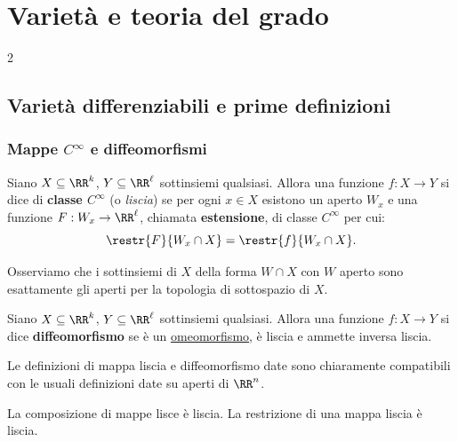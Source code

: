 \chapter{Varietà e teoria del grado}
\setlength{\parindent}{2pt}

\begin{multicols*}{2}
    \section{Varietà differenziabili e prime definizioni}

    \subsection{Mappe \texorpdfstring{$C^\infty$}{C∞} e diffeomorfismi}

    \begin{definition} Siano $X \subseteq \RR^k$,
        $Y \subseteq \RR^\ell$ sottinsiemi qualsiasi. Allora una funzione
        $f : X \to Y$ si dice di \textbf{classe $C^\infty$} (o \textit{liscia}) se per ogni
        $x \in X$ esistono un aperto $W_x$ e una funzione $F : W_x \to \RR^\ell$,
        chiamata \textbf{estensione}, di classe $C^\infty$ per cui:
        \[
            \restr{F}{W_x \cap X} = \restr{f}{W_x \cap X}.
        \]
    \end{definition}

    \begin{remark}
        Osserviamo che i sottinsiemi di $X$ della forma $W \cap X$ con $W$ aperto sono esattamente gli
        aperti per la topologia di sottospazio di $X$.
    \end{remark}

    \begin{definition}[Diffeomorfismo]
        Siano $X \subseteq \RR^k$,
        $Y \subseteq \RR^\ell$ sottinsiemi qualsiasi.
        Allora una funzione $f : X \to Y$ si dice \textbf{diffeomorfismo} se
        è un \underline{omeomorfismo}, è liscia e ammette inversa liscia.
    \end{definition}

    \begin{remark}
        Le definizioni di mappa liscia e diffeomorfismo date sono chiaramente compatibili
        con le usuali definizioni date su aperti di $\RR^n$.
    \end{remark}

    \begin{proposition} \label{prop:comp_liscia}
        La composizione di mappe lisce è liscia. La restrizione di una mappa liscia
        è liscia.
    \end{proposition}


\end{multicols*}
